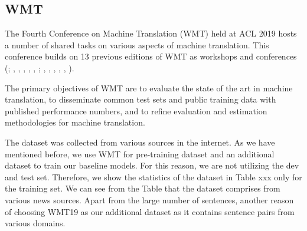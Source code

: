\subsection{WMT}
The Fourth Conference on Machine Translation (WMT) held at ACL 2019 \cite{barrault-etal-2019-findings} hosts a number of shared tasks on various aspects of machine translation. This conference builds on 13 previous editions of WMT as workshops and conferences (\cite{koehn-monz-2006-manual}; \cite{callison-burch-etal-2007-meta}, \cite{callison-burch-etal-2008-meta}, \cite{callison-burch-etal-2009-findings}, \cite{callison-burch-etal-2010-findings}, \cite{callison-burch-etal-2011-findings}, \cite{callison-burch-etal-2012-findings}; \cite{bojar-etal-2013-findings}, \cite{bojar-etal-2014-findings}, \cite{bojar-etal-2015-findings}, \cite{bojar-etal-2016-findings}, \cite{bojar-etal-2017-findings}, \cite{bojar-etal-2018-findings}).

The primary objectives of WMT are to evaluate the state of the art in machine translation, to disseminate common test sets and public training data with published performance numbers, and to refine evaluation and estimation methodologies for machine translation.

The dataset was collected from various sources in the internet. As we have mentioned before, we use WMT for pre-training dataset and an additional dataset to train our baseline models. For this reason, we are not utilizing the dev and test set. Therefore, we show the statistics of the dataset in Table xxx only for the training set. We can see from the Table that the dataset comprises from various news sources. Apart from the large number of sentences, another reason of choosing WMT19 as our additional dataset as it contains sentence pairs from various domains.

